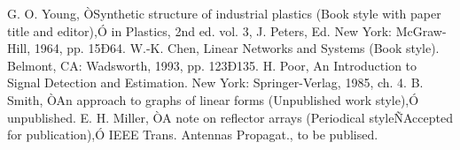 \documentclass[letterpaper, 10 pt, conference]{ieeeconf}  %
\begin{document}
\begin{thebibliography}{99}

 G. O. Young, ÒSynthetic structure of industrial plastics (Book style with paper title and editor),Ó 	in Plastics, 2nd ed. vol. 3, J. Peters, Ed.  New York: McGraw-Hill, 1964, pp. 15Ð64.
 W.-K. Chen, Linear Networks and Systems (Book style).	Belmont, CA: Wadsworth, 1993, pp. 123Ð135.
 H. Poor, An Introduction to Signal Detection and Estimation.   New York: Springer-Verlag, 1985, ch. 4.
 B. Smith, ÒAn approach to graphs of linear forms (Unpublished work style),Ó unpublished.
 E. H. Miller, ÒA note on reflector arrays (Periodical styleÑAccepted for publication),Ó IEEE Trans. Antennas Propagat., to be publised.







\end{thebibliography}
\end{document}
